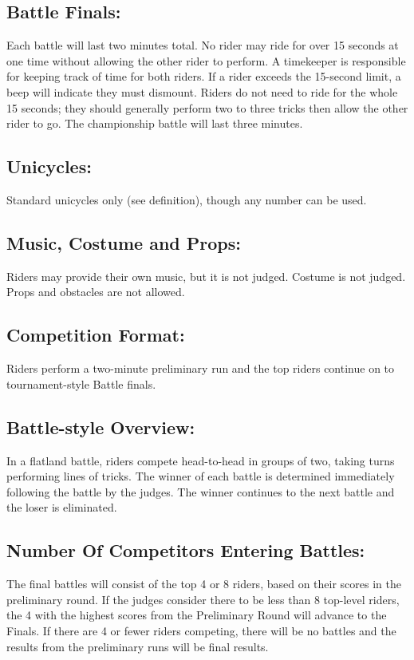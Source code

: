\subsection{Battle Finals:}
Each battle will last two minutes total.
No rider may ride for over 15 seconds at one time without allowing the other rider to perform.
A timekeeper is responsible for keeping track of time for both riders.
If a rider exceeds the 15-second limit, a beep will indicate they must dismount.
Riders do not need to ride for the whole 15 seconds; they should generally perform two to three tricks then allow the other rider to go.
The championship battle will last three minutes.

\subsection{Unicycles:}
Standard unicycles only (see definition), though any number can be used.

\subsection{Music, Costume and Props:}
Riders may provide their own music, but it is not judged.
Costume is not judged.
Props and obstacles are not allowed.

\subsection{Competition Format:}
Riders perform a two-minute preliminary run and the top riders continue on to tournament-style Battle finals.

\subsection{Battle-style Overview:}
In a flatland battle, riders compete head-to-head in groups of two, taking turns performing lines of tricks.
The winner of each battle is determined immediately following the battle by the judges.
The winner continues to the next battle and the loser is eliminated.

\subsection{Number Of Competitors Entering Battles:}
The final battles will consist of the top 4 or 8 riders, based on their scores in the preliminary round.
If the judges consider there to be less than 8 top-level riders, the 4 with the highest scores from the Preliminary Round will advance to the Finals.
If there are 4 or fewer riders competing, there will be no battles and the results from the preliminary runs will be final results.


